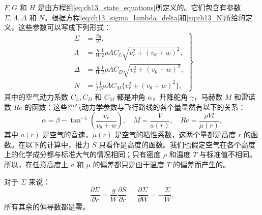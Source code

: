 $F,G$ 和 $H$ 是由方程组\eqref{eq:ch13_state_equations}所定义的。它们包含有参数 $\Sigma,\Lambda,\Delta$ 和 $N$。根据方程\eqref{eq:ch13_sigma_lambda_delta}和\eqref{eq:ch13_N}所给的定义，这些参数可以写成下列形式：
\begin{equation}\label{eq:ch13_param_def}
\left.
\begin{aligned}
\Sigma &= \frac{Sg}{W}, \\
\Lambda &= \frac{g}{W} \frac{1}{2} \rho A C_L \sqrt{v_r^2 + (v_\theta + w)^2}, \\
\Delta &= \frac{g}{W} \frac{1}{2} \rho A C_D \sqrt{v_r^2 + (v_\theta + w)^2}, \\
N &= \frac{1}{I} \frac{1}{2} \rho A C_M \{v_r^2 + (v_\theta + w)^2\},
\end{aligned}
\right\}
\end{equation}
其中的空气动力系数 $C_L,C_D$ 和 $C_M$ 都是冲角 $\alpha$，升降舵角 $\gamma$，马赫数 $M$ 和雷诺数 $Re$ 的函数：这些空气动力学参数与飞行路线的各个量显然有以下的关系：
\begin{equation}\label{eq:ch13_aero_relation}
\alpha = \beta - \tan^{-1}\left( \frac{v_r}{v_\theta + w} \right), \quad M = \frac{V}{a(r)}, \quad Re = \frac{\rho V l}{\mu(r)},
\end{equation}
其中 $a(r)$ 是空气的音速，$\mu(r)$ 是空气的粘性系数，这两个量都是高度 $r$ 的函数。在以下的计算中，推力 $S$ 只看作是高度的函数。我们也假定空气在各个高度上的化学成分都与标准大气的情况相同；只有密度 $\rho$ 和温度 $T$ 与标准值不相同。所以，在任意高度上 $a$ 和 $\mu$ 的偏差都只是由于温度 $T$ 的偏差而产生的。

对于 $\Sigma$ 来说：
\begin{equation}\label{eq:ch13_sigma_deriv}
\frac{\partial \Sigma}{\partial r} = \frac{g}{W} \frac{\partial S}{\partial r}, \quad \frac{\partial \Sigma}{\partial W} = -\frac{\Sigma}{W},
\end{equation}
所有其余的偏导数都是零。

